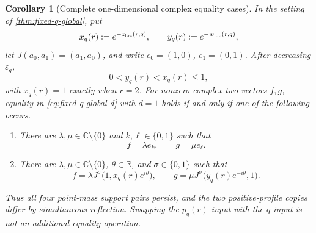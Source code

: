 \documentclass[11pt,reqno]{amsart}
\numberwithin{equation}{section}
\newtheorem{corollary}[corollary]{Corollary}
\theoremstyle{definition}
\theoremstyle{remark}
\newcommand{\R}{\mathbb R}
\newcommand{\C}{\mathbb C}
\begin{document}
\begin{corollary}[Complete one-dimensional complex equality cases]
\label{cor:fixed-q-complex-equality}
In the setting of \cref{thm:fixed-q-global}, put
\[
  x_q(r):=e^{-z_{\rm loc}(r,q)},
  \qquad
  y_q(r):=e^{-w_{\rm loc}(r,q)},
\]
let $J(a_0,a_1)=(a_1,a_0)$, and write
$e_0=(1,0)$, $e_1=(0,1)$.  After decreasing $\varepsilon_q$,
\[
  0<y_q(r)<x_q(r)\le1,
\]
with $x_q(r)=1$ exactly when $r=2$.  For nonzero complex two-vectors $f,g$,
equality in \eqref{eq:fixed-q-global-d} with $d=1$ holds if and only if one of
the following occurs.
\begin{enumerate}[label=\textup{(\alph*)}]
  \item There are $\lambda,\mu\in\C\setminus\{0\}$ and $k,\ell\in\{0,1\}$
  such that
  \[
    f=\lambda e_k,\qquad g=\mu e_\ell.
  \]
  \item There are $\lambda,\mu\in\C\setminus\{0\}$,
  $\theta\in\R$, and $\sigma\in\{0,1\}$ such that
  \begin{equation}\label{eq:complex-equality-family}
    f=\lambda J^\sigma\bigl(1,x_q(r)e^{i\theta}\bigr),
    \qquad
    g=\mu J^\sigma\bigl(y_q(r)e^{-i\theta},1\bigr).
  \end{equation}
\end{enumerate}
Thus all four point-mass support pairs persist, and the two positive-profile
copies differ by simultaneous reflection.  Swapping the
$p_q(r)$-input with the $q$-input is not an additional equality operation.
\end{corollary}
\end{document}
